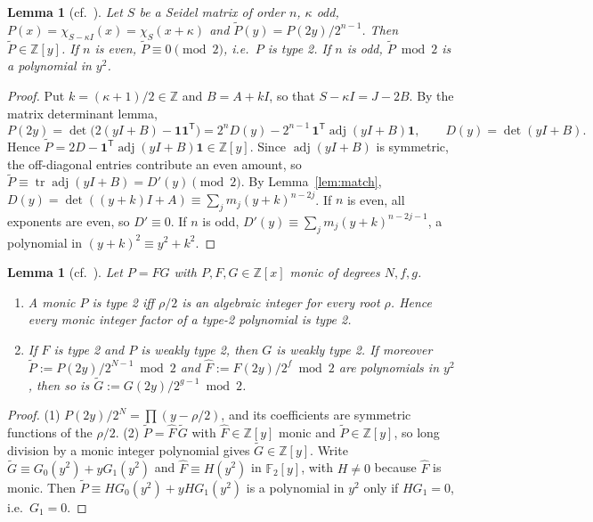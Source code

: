 \documentclass[11pt]{article}
\newtheorem{lemma}[theorem]{Lemma}
\theoremstyle{definition}
\newcommand{\Z}{\mathbb{Z}}
\newcommand{\F}{\mathbb{F}}
\newcommand{\tr}{\operatorname{tr}}
\begin{document}
\begin{lemma}[{cf.\ \cite[Thm.~2.5, Lemma~2.7]{GSY21}}]\label{lem:type2}
Let $S$ be a Seidel matrix of order $n$, $\kappa$ odd, $P(x)=\chi_{S-\kappa I}(x)=\chi_S(x+\kappa)$ and
$\widetilde P(y)=P(2y)/2^{n-1}$. Then $\widetilde P\in\Z[y]$. If $n$ is even, $\widetilde P\equiv0\pmod 2$,
i.e.\ $P$ is type 2. If $n$ is odd, $\widetilde P\bmod 2$ is a polynomial in $y^2$.
\end{lemma}
\begin{proof}
Put $k=(\kappa+1)/2\in\Z$ and $B=A+kI$, so that $S-\kappa I=J-2B$. By the matrix determinant lemma,
\[
P(2y)=\det\bigl(2(yI+B)-\mathbf 1\mathbf 1^{\mathsf T}\bigr)=2^nD(y)-2^{n-1}\,\mathbf 1^{\mathsf T}\operatorname{adj}(yI+B)\mathbf 1,
\qquad D(y)=\det(yI+B).
\]
Hence $\widetilde P=2D-\mathbf 1^{\mathsf T}\operatorname{adj}(yI+B)\mathbf 1\in\Z[y]$. Since $\operatorname{adj}(yI+B)$ is
symmetric, the off-diagonal entries contribute an even amount, so
$\widetilde P\equiv\tr\operatorname{adj}(yI+B)=D'(y)\pmod 2$. By Lemma~\ref{lem:match},
$D(y)=\det((y+k)I+A)\equiv\sum_jm_j(y+k)^{n-2j}$. If $n$ is even, all exponents are even, so
$D'\equiv0$. If $n$ is odd, $D'(y)\equiv\sum_jm_j(y+k)^{n-2j-1}$, a polynomial in
$(y+k)^2\equiv y^2+k^2$.
\end{proof}

\begin{lemma}[{cf.\ \cite[Lemma~2.8]{GSY21}}]\label{lem:divide}
Let $P=FG$ with $P,F,G\in\Z[x]$ monic of degrees $N,f,g$.
\begin{enumerate}
\item A monic $P$ is type 2 iff $\rho/2$ is an algebraic integer for every root $\rho$. Hence every
monic integer factor of a type-2 polynomial is type 2.
\item If $F$ is type 2 and $P$ is weakly type 2, then $G$ is weakly type 2. If moreover
$\widetilde P:=P(2y)/2^{N-1}\bmod2$ and $\widehat F:=F(2y)/2^f\bmod 2$ are polynomials in $y^2$, then so
is $\widetilde G:=G(2y)/2^{g-1}\bmod 2$.
\end{enumerate}
\end{lemma}
\begin{proof}
(1) $P(2y)/2^N=\prod(y-\rho/2)$, and its coefficients are symmetric functions of the $\rho/2$.
(2) $\widetilde P=\widehat F\,\widetilde G$ with $\widehat F\in\Z[y]$ monic and $\widetilde P\in\Z[y]$, so long
division by a monic integer polynomial gives $\widetilde G\in\Z[y]$. Write
$\widetilde G\equiv G_0(y^2)+yG_1(y^2)$ and $\widehat F\equiv H(y^2)$ in $\F_2[y]$, with $H\neq0$ because
$\widehat F$ is monic. Then $\widetilde P\equiv HG_0(y^2)+yHG_1(y^2)$ is a polynomial in $y^2$ only if
$HG_1=0$, i.e.\ $G_1=0$.
\end{proof}
\end{document}
